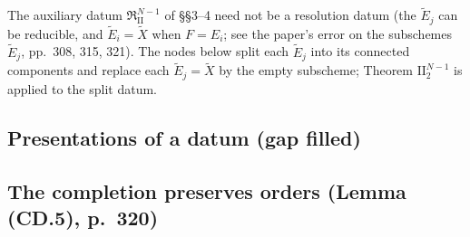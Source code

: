 The auxiliary datum $\mathfrak R^{N-1}_{\mathrm{II}}$ of \S\S3--4 need not be a resolution datum (the $\tilde E_j$ can be
reducible, and $\tilde E_i=\tilde X$ when $F=E_i$; see the paper's error on the subschemes $\tilde E_j$, pp.~308, 315, 321). The nodes below split each
$\tilde E_j$ into its connected components and replace each $\tilde E_j=\tilde X$ by the empty subscheme; Theorem
$\mathrm{II}_2^{N-1}$ is applied to the split datum.



\subsection*{Presentations of a datum (gap filled)}


\subsection*{The completion preserves orders (Lemma (CD.5), p.~320)}



